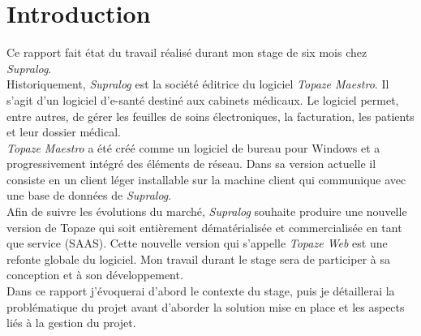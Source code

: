 \newpage
\section{Introduction} %

Ce rapport fait état du travail réalisé durant mon stage de six mois chez \textit{Supralog}.\\

Historiquement, \textit{Supralog} est la société éditrice du logiciel \textit{\gls{Topaze Maestro}}. Il s’agit d’un logiciel d’e-santé destiné aux cabinets médicaux. Le logiciel permet, entre autres, de gérer les feuilles de soins électroniques, la facturation, les patients et leur dossier médical.\\
\textit{Topaze Maestro} a été créé comme un logiciel de bureau pour Windows et a progressivement intégré des éléments de réseau. Dans sa version actuelle il consiste en un client léger installable sur la machine client qui communique avec une base de données de \textit{Supralog}.\\

Afin de suivre les évolutions du marché, \textit{Supralog} souhaite produire une nouvelle version de Topaze qui soit entièrement dématérialisée et commercialisée en tant que service (\gls{SAAS}). Cette nouvelle version qui s’appelle \textit{\gls{Topaze Web}} est une refonte globale du logiciel. Mon travail durant le stage sera de participer à sa conception et à son développement.\\

Dans ce rapport j’évoquerai d’abord le contexte du stage, puis je détaillerai la problématique du projet avant d’aborder la solution mise en place et les aspects liés à la gestion du projet. 

